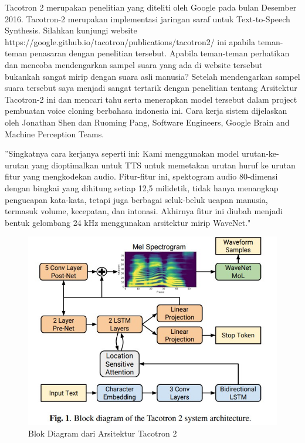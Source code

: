 Tacotron 2 merupakan penelitian yang diteliti oleh Google pada bulan Desember 2016. Tacotron-2 merupakan implementasi jaringan saraf untuk Text-to-Speech Synthesis. Silahkan kunjungi website https://google.github.io/tacotron/publications/tacotron2/ ini apabila teman-teman penasaran dengan penelitian tersebut. Apabila teman-teman perhatikan dan mencoba mendengarkan sampel suara yang ada di website tersebut bukankah sangat mirip dengan suara asli manusia? Setelah mendengarkan sampel suara tersebut saya menjadi sangat tertarik dengan penelitian tentang Arsitektur Tacotron-2 ini dan mencari tahu serta menerapkan model tersebut dalam project pembuatan voice cloning berbahasa indonesia ini. Cara kerja sistem dijelaskan oleh Jonathan Shen dan Ruoming Pang, Software Engineers, Google Brain and Machine Perception Teams.

''Singkatnya cara kerjanya seperti ini: Kami menggunakan model urutan-ke-urutan yang dioptimalkan untuk TTS untuk memetakan urutan huruf ke urutan fitur yang mengkodekan audio. Fitur-fitur ini, spektogram audio 80-dimensi dengan bingkai yang dihitung setiap 12,5 milidetik, tidak hanya menangkap pengucapan kata-kata, tetapi juga berbagai seluk-beluk ucapan manusia, termasuk volume, kecepatan, dan intonasi. Akhirnya fitur ini diubah menjadi bentuk gelombang 24 kHz menggunakan arsitektur mirip WaveNet."

\begin{figure}[H]
        \centerline{\includegraphics[scale=.75]{figures/fig1}}
        \caption{Blok Diagram dari Arsitektur Tacotron 2}
		\label{fig1}
\end{figure}

